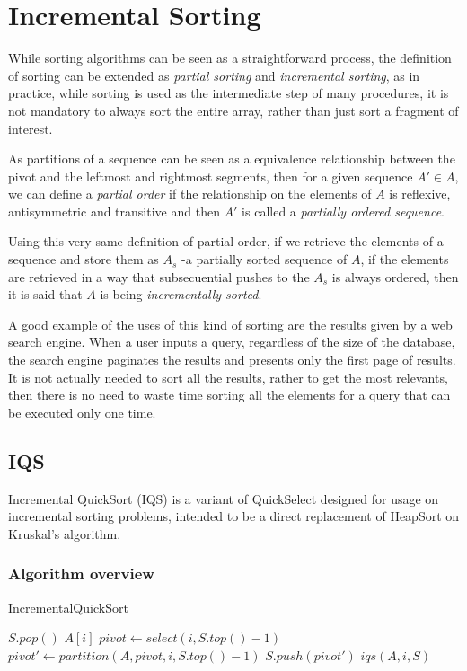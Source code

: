 
\section{Incremental Sorting}

While sorting algorithms can be seen as a straightforward process, the definition of sorting can be extended as \textit{partial sorting} and \textit{incremental sorting}, as in practice, while sorting is used as the intermediate step of many procedures, it is not mandatory to always sort the entire array, rather than just sort a fragment of interest.

As partitions of a sequence can be seen as a equivalence relationship between the pivot and the leftmost and rightmost segments\cite{10.5555/1614191}, then for a given sequence $A' \in A$, we can define a \textit{partial order} if the relationship on the elements of $A$ is reflexive, antisymmetric and transitive and then $A'$ is called a \textit{partially ordered sequence}.

Using this very same definition of partial order, if we retrieve the elements of a sequence and store them as $A_s$ -a partially sorted sequence of $A$, if the elements are retrieved in a way that subsecuential pushes to the $A_s$ is always ordered, then it is said that $A$ is being \textit{incrementally sorted}.

A good example of the uses of this kind of sorting are the results given by a web search engine. When a user inputs a query, regardless of the size of the database, the search engine paginates the results and presents only the first page of results. It is not actually needed to sort all the results, rather to get the most relevants, then there is no need to waste time sorting all the elements for a query that can be executed only one time.

\subsection{IQS}
Incremental QuickSort (IQS) \cite{Navarro_Paredes_2010} is a variant of QuickSelect designed for usage on incremental sorting problems, intended to be a direct replacement of HeapSort on Kruskal's algorithm.

\subsubsection{Algorithm overview}

\begin{algorithm}
  \caption{IncrementalQuickSort}\label{ALG:IQS}
  \begin{algorithmic}[1]
    \State $S.pop()$
    \Return $A[i]$
    \EndIf
    \State $pivot \gets select(i, S.top()-1)$
    \State $pivot' \gets partition(A,pivot,i, S.top()-1)$
    \State $S.push(pivot')$
    \State \Return $iqs(A,i,S)$
    \EndProcedure
  \end{algorithmic}
\end{algorithm}

